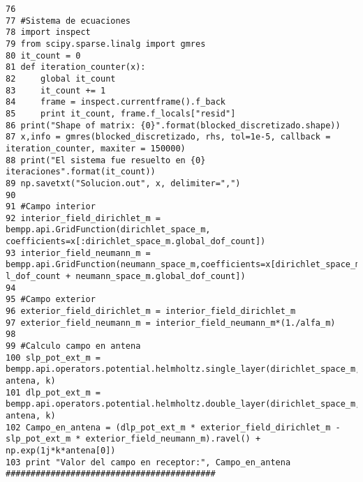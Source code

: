 \documentclass[12pt,letterpaper]{article}
\numberwithin{equation}{section}
\begin{document}
\begin{lstlisting}
76 
77 #Sistema de ecuaciones
78 import inspect
79 from scipy.sparse.linalg import gmres
80 it_count = 0
81 def iteration_counter(x):
82     global it_count
83     it_count += 1
84     frame = inspect.currentframe().f_back
85     print it_count, frame.f_locals["resid"]
86 print("Shape of matrix: {0}".format(blocked_discretizado.shape))
87 x,info = gmres(blocked_discretizado, rhs, tol=1e-5, callback = iteration_counter, maxiter = 150000)
88 print("El sistema fue resuelto en {0} iteraciones".format(it_count))
89 np.savetxt("Solucion.out", x, delimiter=",")
90 
91 #Campo interior
92 interior_field_dirichlet_m = bempp.api.GridFunction(dirichlet_space_m, coefficients=x[:dirichlet_space_m.global_dof_count])
93 interior_field_neumann_m = bempp.api.GridFunction(neumann_space_m,coefficients=x[dirichlet_space_m.global_dof_count:dirichlet_space_m.globa    l_dof_count + neumann_space_m.global_dof_count])
94 
95 #Campo exterior
96 exterior_field_dirichlet_m = interior_field_dirichlet_m
97 exterior_field_neumann_m = interior_field_neumann_m*(1./alfa_m)
98 
99 #Calculo campo en antena
100 slp_pot_ext_m = bempp.api.operators.potential.helmholtz.single_layer(dirichlet_space_m, antena, k)
101 dlp_pot_ext_m = bempp.api.operators.potential.helmholtz.double_layer(dirichlet_space_m, antena, k)
102 Campo_en_antena = (dlp_pot_ext_m * exterior_field_dirichlet_m - slp_pot_ext_m * exterior_field_neumann_m).ravel() + np.exp(1j*k*antena[0])
103 print "Valor del campo en receptor:", Campo_en_antena
##########################################

\end{lstlisting}
\end{document}
